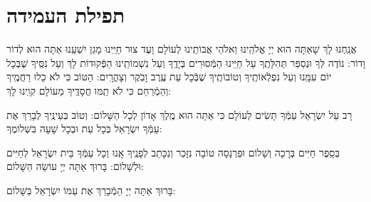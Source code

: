 \documentclass[twoside, openany, parskip=half, 11pt]{book}
\begin{document}
\yerueinnu 

\halfkaddish 

 \section*{ תפילת העמידה }
 

\weekdaysaavos

\weekdaysamechayey

\weekdaysakiddushhashem

\weekdaysabinah

\weekdaysateshuva

\weekdaysaselichah

\weekdaysageulah

\weekdaysarefuah

\weekdaysaberacha

\weekdaysashofar

\weekdaysamishpat

\weekdaysaminim

\weekdaysatzadikim

\weekdaysayerushelayim

\weekdaysamalchus

\weekdaysashemakoleinu

\retzeh

\clearpage

\yaalehveyavo

\zion

\newcommand{\maarivmodim}{
\firstword{מוֹדִים}
 אֲנַֽחְנוּ לָךְ שָׁאַתָּה הוּא יְיָ אֱלֹהֵֽינוּ וֵאלֹהֵי אֲבוֹתֵֽינוּ לְעוֹלָם וָעֶד צוּר חַיֵּֽינוּ מָגֵן יִשְׁעֵֽנוּ אַתָּה הוּא לְדוֹר וָדוֹר: נוֹדֶה לְּךָ וּנְסַפֵּר תְּהִלָּתֶֽךָ עַל חַיֵּֽינוּ הַמְּֿסוּרִים בְּיָדֶֽךָ וְעַל נִשְׁמוֹתֵֽינוּ הַפְּֿקוּדוֹת לָךְ וְעַל נִסֶּֽיךָ שֶׁבְּכָל יוֹם עִמָּֽנוּ וְעַל נִפְלְֿאוֹתֶֽיךָ וְטוֹבוֹתֶֽיךָ שֶׁבְּֿכָל עֵת עֶֽרֶב וָבֹֽקֶר וְצָהֳרָֽיִם: הַטּוֹב כִּי לֹא כָלוּ רַחֲמֶֽיךָ וְהַמְֿרַחֵם כִּי לֹא תַֽמּוּ חֲסָדֶֽיךָ מֵעוֹלָם קִוִֽינוּ לָךְ:
}

\maarivmodim

\alhanisim

\weekdaysahodos

 רָב עַל יִשְׂרָאֵל עַמְּֿךָ תָּשִׂים לְעוֹלָם כִּי אַתָּה הוּא מֶֽלֶךְ אָדוֹן לְכָל הַשָּׁלוֹם: וְטוֹב בְּעֵינֶֽיךָ לְבָרֵךְ אֶת עַמְּֿךָ יִשְׂרָאֵל בְּכָל עֵת וּבְכָל שָׁעָה בִּשְׁלוֹמֶךָ:
\begin{paracol}{2}

\begin{small}
בְּסֵֽפֶר חַיִּים בְּרָכָה וְשָׁלוֹם וּפַרְנָסָה טוֹבָה נִזָּכֵר וְנִכָּתֵב לְפָנֶֽיךָ אָֽנוּ וְכָל עַמְּֿךָ בֵּית יִשְׂרָאֵל לְחַיִּים וּלְשָׁלוֹם: בָּרוּךְ אַתָּה יְיָ עוֹשֵׂה הַשָּׁלוֹם:

\end{small}
\switchcolumn
בָּרוּךְ אַתָּה יְיָ הַמְֿבָרֵךְ אֶת עַמּוֹ יִשְׂרָאֵל בַּשָּׁלוֹם:

\end{paracol}
\end{document}
